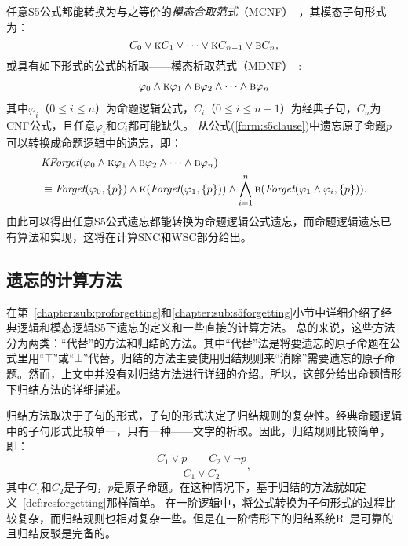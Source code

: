 任意S5公式都能转换为与之等价的\emph{模态合取范式}（MCNF）~\cite{DBLP:conf/aaai/Bienvenu07}，其模态子句形式为：
$$C_0 \vee \textsc{k} C_1 \vee \dots \vee \textsc{k} C_{n-1} \vee \textsc{b} C_n,$$
或具有如下形式的公式的析取——模态析取范式（MDNF）~\cite{Yongmei:IJCAI:2011,Zhang2008Properties}:
\begin{align}\label{form:s5clause}
	\varphi_0 \wedge \textsc{k} \varphi_1 \wedge \textsc{b} \varphi_2 \wedge \dots \wedge \textsc{b} \varphi_n
\end{align}
其中$\varphi_i$（$0\leq i \leq n$）为命题逻辑公式，$C_i$（$0\leq i \leq n-1$）为经典子句，$C_n$为CNF公式，且任意$\varphi_i$和$C_i$都可能缺失。
从公式(\ref{form:s5clause})中遗忘原子命题$p$可以转换成命题逻辑中的遗忘，即：
\begin{align*}
	&\textit{KForget}(\varphi_0 \wedge \textsc{k} \varphi_1 \wedge \textsc{b} \varphi_2 \wedge \dots \wedge \textsc{b} \varphi_n)\\
	&\equiv \textit{Forget}(\varphi_0, \{p\}) \wedge \textsc{k}(\textit{Forget}(\varphi_1, \{p\})) \wedge \bigwedge_{i=1}^{n}\textsc{b}(\textit{Forget}(\varphi_1 \wedge \varphi_i, \{p\})).
\end{align*}
由此可以得出任意S5公式遗忘都能转换为命题逻辑公式遗忘，而命题逻辑遗忘已有算法和实现，这将在计算SNC和WSC部分给出。





\subsection{遗忘的计算方法}
在第~\ref{chapter:sub:proforgetting}和\ref{chapter:sub:s5forgetting}小节中详细介绍了经典逻辑和模态逻辑S5下遗忘的定义和一些直接的计算方法。
总的来说，这些方法分为两类：“代替”的方法和归结的方法。其中“代替”法是将要遗忘的原子命题在公式里用“$\top$”或“$\bot$”代替，归结的方法主要使用归结规则来“消除”需要遗忘的原子命题。然而，上文中并没有对归结方法进行详细的介绍。所以，这部分给出命题情形下归结方法的详细描述。%

归结方法取决于子句的形式，子句的形式决定了归结规则的复杂性。经典命题逻辑中的子句形式比较单一，只有一种——文字的析取。因此，归结规则比较简单，即：
$$\frac{C_1 \vee p \qquad C_2 \vee \neg p}{C_1 \vee C_2},$$
其中$C_1$和$C_2$是子句，$p$是原子命题。在这种情况下，基于归结的方法就如定义~\ref{def:resforgetting}那样简单。
在一阶逻辑中，将公式转换为子句形式的过程比较复杂，而归结规则也相对复杂一些。但是在一阶情形下的归结系统R~\cite{DBLP:books/daglib/0023036}是可靠的且归结反驳是完备的。


